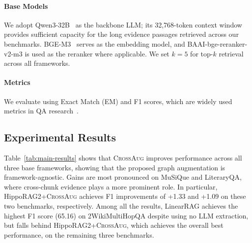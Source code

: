 \documentclass[11pt]{article}
\newcommand{\ours}{\textsc{CrossAug}\xspace}
\begin{document}
\paragraph{Base Models}

We adopt Qwen3-32B~\citep{yang2025qwen3} as the backbone LLM; its 32,768-token context window provides sufficient capacity for the long evidence passages retrieved across our benchmarks. BGE-M3~\citep{chen2024bge} serves as the embedding model, and BAAI-bge-reranker-v2-m3 is used as the reranker where applicable. We set $k{=}5$ for top-$k$ retrieval across all frameworks.

\paragraph{Metrics}
We evaluate using Exact Match (EM) and F1 scores, which are widely used metrics in QA research~\citep{gutierrez2024hipporag, guo2024lightrag, luo2026gfm}.

\subsection{Experimental Results}





Table~\ref{tab:main-results} shows that \ours improves performance across all three base frameworks, showing that the proposed graph augmentation is framework-agnostic. 
Gains are most pronounced on MuSiQue and LiteraryQA,
where cross-chunk evidence plays a more prominent role. In particular, HippoRAG2+\ours achieves F1 improvements of +1.33 and +1.09 on these two benchmarks, respectively. Among all the results, LinearRAG achieves the highest F1 score (65.16) on 2WikiMultiHopQA despite using no LLM extraction, but falls behind HippoRAG2+\ours, which achieves the overall best performance, on the remaining three benchmarks.
\end{document}
